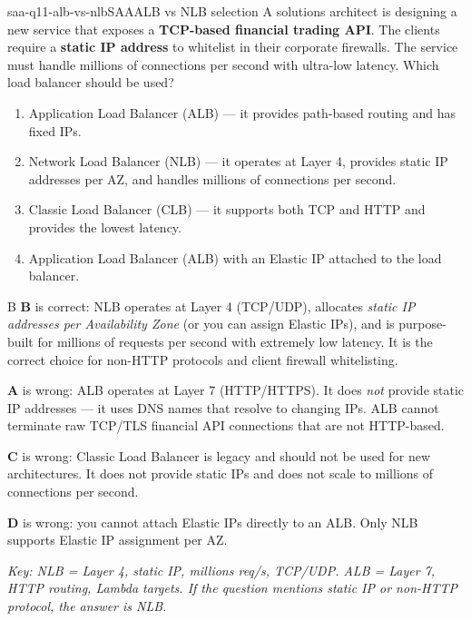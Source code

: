 
\begin{question}{saa-q11-alb-vs-nlb}{SAA}{ALB vs NLB selection}
A solutions architect is designing a new service that exposes a \textbf{TCP-based financial trading API}. The clients require a \textbf{static IP address} to whitelist in their corporate firewalls. The service must handle millions of connections per second with ultra-low latency. Which load balancer should be used?

\begin{enumerate}[label=\Alph*.]
  \item Application Load Balancer (ALB) --- it provides path-based routing and has fixed IPs.
  \item Network Load Balancer (NLB) --- it operates at Layer 4, provides static IP addresses per AZ, and handles millions of connections per second.
  \item Classic Load Balancer (CLB) --- it supports both TCP and HTTP and provides the lowest latency.
  \item Application Load Balancer (ALB) with an Elastic IP attached to the load balancer.
\end{enumerate}
\end{question}

\begin{answer}{B}
\textbf{B} is correct: NLB operates at Layer 4 (TCP/UDP), allocates \emph{static IP addresses per Availability Zone} (or you can assign Elastic IPs), and is purpose-built for millions of requests per second with extremely low latency. It is the correct choice for non-HTTP protocols and client firewall whitelisting.

\textbf{A} is wrong: ALB operates at Layer 7 (HTTP/HTTPS). It does \emph{not} provide static IP addresses --- it uses DNS names that resolve to changing IPs. ALB cannot terminate raw TCP/TLS financial API connections that are not HTTP-based.

\textbf{C} is wrong: Classic Load Balancer is legacy and should not be used for new architectures. It does not provide static IPs and does not scale to millions of connections per second.

\textbf{D} is wrong: you cannot attach Elastic IPs directly to an ALB. Only NLB supports Elastic IP assignment per AZ.

\textit{Key: NLB = Layer 4, static IP, millions req/s, TCP/UDP. ALB = Layer 7, HTTP routing, Lambda targets. If the question mentions static IP or non-HTTP protocol, the answer is NLB.}
\end{answer}

